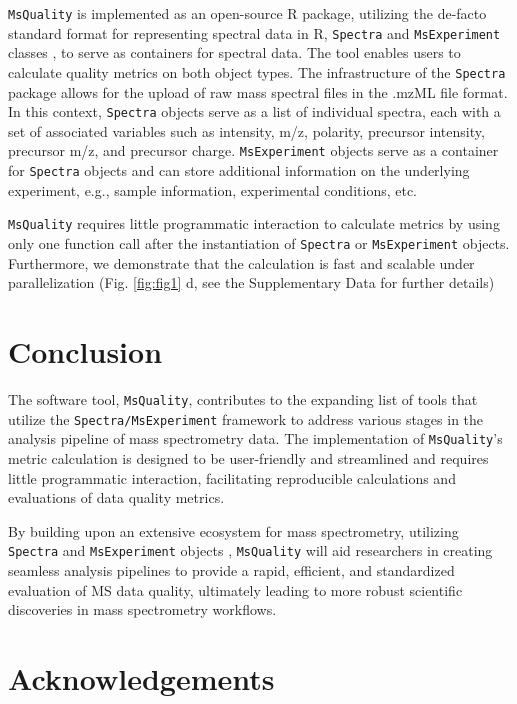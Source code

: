 \documentclass{bioinfo}
\begin{document}
\texttt{MsQuality} is implemented as an open-source R package, utilizing the 
de-facto standard format for representing spectral data in R, \texttt{Spectra} 
and \texttt{MsExperiment} classes \citep{Rainer2022}, to serve as containers 
for spectral data. The tool enables users to calculate quality metrics on 
both object types. The infrastructure of the \texttt{Spectra} package allows 
for the upload of raw mass spectral files in the .mzML file format. In this 
context, \texttt{Spectra} objects serve as a list of individual spectra, 
each with a set of associated variables such as 
intensity, m/z, polarity, precursor intensity, precursor m/z, and precursor 
charge. \texttt{MsExperiment} objects serve as a container for \texttt{Spectra} 
objects and can store additional information on the underlying experiment, 
e.g., sample information, experimental conditions, etc.

\texttt{MsQuality} requires little programmatic interaction to calculate metrics 
by using only one function call after the instantiation of \texttt{Spectra} or 
\texttt{MsExperiment}
objects.
Furthermore, we demonstrate that the calculation is fast and scalable under 
parallelization (Fig. \ref{fig:fig1} d, 
see the Supplementary Data for further details)

\section{Conclusion}

The software tool, \texttt{MsQuality}, contributes to the expanding list of 
tools that utilize the \texttt{Spectra/MsExperiment} framework to address 
various stages in the analysis pipeline of mass spectrometry data.
The implementation of \texttt{MsQuality}'s metric calculation is designed
to be user-friendly and streamlined and requires little programmatic 
interaction, facilitating reproducible calculations and evaluations of data 
quality metrics.

By building upon an extensive ecosystem for mass spectrometry, utilizing
\texttt{Spectra} and \texttt{MsExperiment} objects \citep{Rainer2022},  
\texttt{MsQuality} will aid researchers in creating seamless analysis pipelines 
to provide a rapid, efficient, and standardized evaluation of MS data quality, 
ultimately leading to more robust scientific discoveries in mass spectrometry
workflows.


\section{Acknowledgements}
\end{document}
